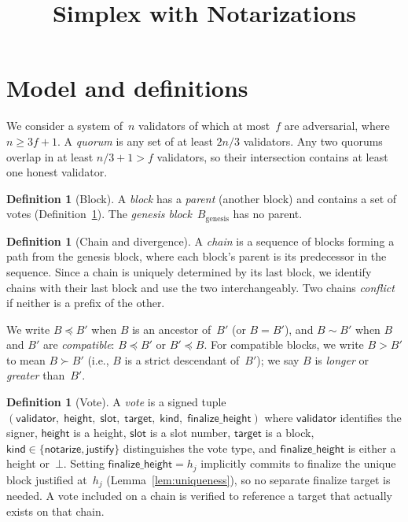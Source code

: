 \ifx\litemode\undefined\documentclass{article}\fi
\title{Simplex with Notarizations}
\newcommand{\target}{\mathsf{target}}
\newcommand{\kind}{\mathsf{kind}}
\newcommand{\height}{\mathsf{height}}
\newcommand{\validator}{\mathsf{validator}}
\newcommand{\justify}{\mathsf{justify}}
\newcommand{\notarize}{\mathsf{notarize}}
\theoremstyle{plain}
\theoremstyle{definition}
\newtheorem{definition}[theorem]{Definition}
\theoremstyle{remark}
\begin{document}
\maketitle

\section{Model and definitions}

We consider a system of~$n$ validators of which at most~$f$ are adversarial, where $n \geq 3f + 1$.
A \emph{quorum} is any set of at least $2n/3$ validators.
Any two quorums overlap in at least $n/3 + 1 > f$ validators, so their intersection contains at least one honest validator.

\begin{definition}[Block]\label{def:block}
A \emph{block} has a \emph{parent} (another block) and contains a set of votes (Definition~\ref{def:vote}).
The \emph{genesis block}~$B_{\mathrm{genesis}}$ has no parent.
\end{definition}

\begin{definition}[Chain and divergence]\label{def:chain}
A \emph{chain} is a sequence of blocks forming a path from the genesis block, where each block's parent is its predecessor in the sequence.
Since a chain is uniquely determined by its last block, we identify chains with their last block and use the two interchangeably.
Two chains \emph{conflict} if neither is a prefix of the other.
\end{definition}

We write $B \preceq B'$ when $B$ is an ancestor of~$B'$ (or $B = B'$), and $B \sim B'$ when $B$ and $B'$ are \emph{compatible}: $B \preceq B'$ or $B' \preceq B$.
For compatible blocks, we write $B > B'$ to mean $B \succ B'$ (i.e., $B$ is a strict descendant of~$B'$); we say $B$ is \emph{longer} or \emph{greater} than~$B'$.

\begin{definition}[Vote]\label{def:vote}
A \emph{vote} is a signed tuple $(\validator,\; \height,\; \mathsf{slot},\; \target,\; \kind,\; \mathsf{finalize\_height})$ where $\validator$ identifies the signer, $\height$ is a height, $\mathsf{slot}$ is a slot number, $\target$ is a block, $\kind \in \{\notarize, \justify\}$ distinguishes the vote type, and $\mathsf{finalize\_height}$ is either a height or~$\bot$.
Setting $\mathsf{finalize\_height} = h_j$ implicitly commits to finalize the unique block justified at~$h_j$ (Lemma~\ref{lem:uniqueness}), so no separate finalize target is needed.
A vote included on a chain is verified to reference a target that actually exists on that chain.
\end{definition}
\end{document}
